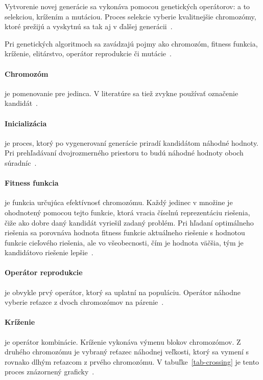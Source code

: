 \documentclass[a4paper,slovak,12pt,appendix]{article}
\begin{document}
Vytvorenie novej generácie sa vykonáva pomocou genetických operátorov:
a to selekciou, krížením a mutáciou. Proces selekcie vyberie kvalitnejšie
chromozómy, ktoré prežijú a vyskytnú sa tak aj v ďalšej
generácii~\cite{Simonova2007}.

Pri genetických algoritmoch sa zavádzajú pojmy ako chromozóm, fitness funkcia,
kríženie, elitárstvo, operátor reprodukcie či mutácie~\cite{Chavan2015}.

\paragraph{Chromozóm} je pomenovanie pre jedinca. V literatúre sa tiež zvykne
používať označenie kandidát~\cite{Arun2016}.

\paragraph{Inicializácia} je proces, ktorý po vygenerovaní generácie priradí
kandidátom náhodné hodnoty. Pri prehľadávaní dvojrozmerného priestoru to budú
náhodné hodnoty oboch súradníc~\cite{Lazinica2009}.

\paragraph{Fitness funkcia} je funkcia určujúca efektívnosť chromozómu. Každý
jedinec v množine je ohodnotený pomocou tejto funkcie, ktorá vracia číselnú
reprezentáciu riešenia, čiže ako dobre daný kandidát vyriešil zadaný problém.
Pri hľadaní optimálneho riešenia sa porovnáva hodnota fitness funkcie aktuálneho
riešenie s hodnotou funkcie cieľového riešenia, ale vo všeobecnosti, čím je
hodnota väčšia, tým je kandidátovo riešenie
lepšie~\cite{Chavan2015, Lazinica2009, Simonova2007}.

\paragraph{Operátor reprodukcie} je obvykle prvý operátor, ktorý sa uplatní na
populáciu. Operátor náhodne vyberie reťazce z dvoch chromozómov na
párenie~\cite{Chavan2015}.

\paragraph{Kríženie} je operátor kombinácie. Kríženie vykonáva výmenu blokov
chromozómov. Z druhého chromozómu je vybraný reťazec náhodnej veľkosti, ktorý
sa vymení s rovnako dlhým reťazcom z prvého chromozómu.
V tabuľke~\ref{tab-crossing} je tento proces znázornený
graficky~\cite{Chavan2015}.
\end{document}
